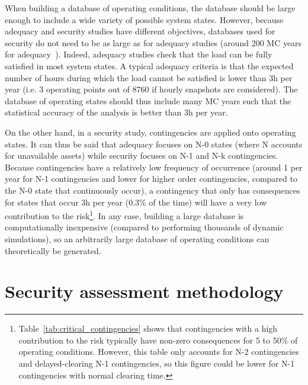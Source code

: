 When building a database of operating conditions, the database should be large enough to include a wide variety of possible system states. However, because adequacy and security studies have different objectives, databases used for security do not need to be as large as for adequacy studies (around 200 MC years for adequacy~\cite{EliaAdequacy}). Indeed, adequacy studies check that the load can be fully satisfied in most system states. A typical adequacy criteria is that the expected number of hours during which the load cannot be satisfied is lower than 3h per year (i.e. 3 operating points out of 8760 if hourly snapshots are considered). The database of operating states should thus include many MC years such that the statistical accuracy of the analysis is better than 3h per year.

On the other hand, in a security study, contingencies are applied onto operating states. It can thus be said that adequacy focuses on N-0 states (where N accounts for unavailable assets) while security focuses on N-1 and N-k contingencies. Because contingencies have a relatively low frequency of occurrence (around 1 per year for N-1 contingencies and lower for higher order contingencies, compared to the N-0 state that continuously occur), a contingency that only has consequences for states that occur 3h per year (0.3\% of the time) will have a very low contribution to the risk\footnote{Table~\ref{tab:critical_contingencies} shows that contingencies with a high contribution to the risk typically have non-zero consequences for 5 to 50\% of operating conditions. However, this table only accounts for N-2 contingencies and delayed-clearing N-1 contingencies, so this figure could be lower for N-1 contingencies with normal clearing time.}. In any case, building a large database is computationally inexpensive (compared to performing thousands of dynamic simulations), so an arbitrarily large database of operating conditions can theoretically be generated.





\section{Security assessment methodology}
\label{sec:PDSA_methodology}

